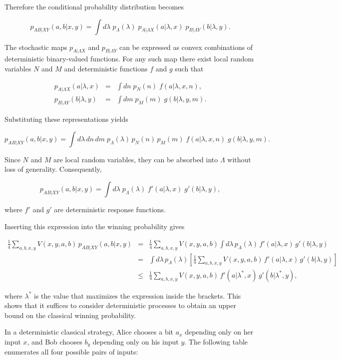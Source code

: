 \documentclass[12pt, letterpaper]{article}
\begin{document}
Therefore the conditional probability distribution becomes

\[
p_{AB|XY}(a,b|x,y) = \int d\lambda \; p_\Lambda(\lambda) \; p_{A|\Lambda X}(a|\lambda,x) \; p_{B|\Lambda Y}(b|\lambda,y).
\]

The stochastic maps $p_{A|\Lambda X}$ and $p_{B|\Lambda Y}$ can be expressed as convex combinations of deterministic binary-valued functions. For any such map there exist local random variables $N$ and $M$ and deterministic functions $f$ and $g$ such that

\begin{eqnarray*}
    p_{A|\Lambda X}(a|\lambda,x) &=& \int dn \; p_N(n) \; f(a|\lambda,x,n),\\
    p_{B|\Lambda Y}(b|\lambda,y) &=& \int dm \; p_M(m) \; g(b|\lambda,y,m).
\end{eqnarray*}

Substituting these representations yields

\[
p_{AB|XY}(a,b|x,y) = \int d\lambda \, dn \, dm \; p_\Lambda(\lambda)\, p_N(n)\, p_M(m) \; f(a|\lambda,x,n) \; g(b|\lambda,y,m).
\]

Since $N$ and $M$ are local random variables, they can be absorbed into $\Lambda$ without loss of generality. Consequently,

\[
p_{AB|XY}(a,b|x,y) = \int d\lambda \; p_\Lambda(\lambda) \; f'(a|\lambda,x) \; g'(b|\lambda,y),
\]

where $f'$ and $g'$ are deterministic response functions.

Inserting this expression into the winning probability gives

\begin{eqnarray*}
    \frac{1}{4}\sum_{a,b,x,y}V(x,y,a,b) \, p_{AB|XY}(a,b|x,y)
    &=& \frac{1}{4}\sum_{a,b,x,y}V(x,y,a,b) \int d\lambda \, p_\Lambda(\lambda) \, f'(a|\lambda,x) \, g'(b|\lambda,y) \\
    &=& \int d\lambda \, p_\Lambda(\lambda) \left[ \frac{1}{4}\sum_{a,b,x,y} V(x,y,a,b) \, f'(a|\lambda,x) \, g'(b|\lambda,y) \right] \\
    &\leq& \frac{1}{4}\sum_{a,b,x,y} V(x,y,a,b) \, f'(a|\lambda^*,x) \, g'(b|\lambda^*,y),
\end{eqnarray*}

where $\lambda^*$ is the value that maximizes the expression inside the brackets. This shows that it suffices to consider deterministic processes to obtain an upper bound on the classical winning probability.

In a deterministic classical strategy, Alice chooses a bit $a_x$ depending only on her input $x$, and Bob chooses $b_y$ depending only on his input $y$. The following table enumerates all four possible pairs of inputs:
\end{document}
